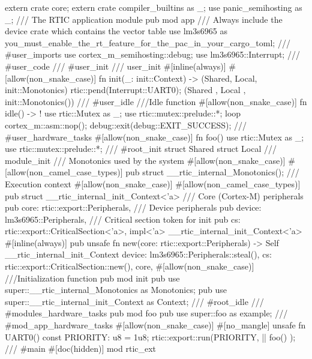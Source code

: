 extern crate core;
extern crate compiler_builtins as _;
use panic_semihosting as _;
/// The RTIC application module
pub mod app {
    /// Always include the device crate which contains the vector table
    use lm3s6965 as you_must_enable_the_rt_feature_for_the_pac_in_your_cargo_toml;
    /// #user_imports
    use cortex_m_semihosting::debug;
    use lm3s6965::Interrupt;
    /// #user_code
    /// #user_init
    /// user_init
    #[inline(always)]
    #[allow(non_snake_case)]
    fn init(_: init::Context) -> (Shared, Local, init::Monotonics) {
        rtic::pend(Interrupt::UART0);
        (Shared {}, Local {}, init::Monotonics())
    }
    /// #user_idle
    ///Idle function
    #[allow(non_snake_case)]
    fn idle() -> ! {
        use rtic::Mutex as _;
        use rtic::mutex::prelude::*;
        loop {
            cortex_m::asm::nop();
            debug::exit(debug::EXIT_SUCCESS);
        }
    }
    /// #user_hardware_tasks
    #[allow(non_snake_case)]
    fn foo() {
        use rtic::Mutex as _;
        use rtic::mutex::prelude::*;
    }
    /// #root_init
    struct Shared {}
    struct Local {}
    /// module_init
    /// Monotonics used by the system
    #[allow(non_snake_case)]
    #[allow(non_camel_case_types)]
    pub struct __rtic_internal_Monotonics();
    /// Execution context
    #[allow(non_snake_case)]
    #[allow(non_camel_case_types)]
    pub struct __rtic_internal_init_Context<'a> {
        /// Core (Cortex-M) peripherals
        pub core: rtic::export::Peripherals,
        /// Device peripherals
        pub device: lm3s6965::Peripherals,
        /// Critical section token for init
        pub cs: rtic::export::CriticalSection<'a>,
    }
    impl<'a> __rtic_internal_init_Context<'a> {
        #[inline(always)]
        pub unsafe fn new(core: rtic::export::Peripherals) -> Self {
            __rtic_internal_init_Context {
                device: lm3s6965::Peripherals::steal(),
                cs: rtic::export::CriticalSection::new(),
                core,
            }
        }
    }
    #[allow(non_snake_case)]
    ///Initialization function
    pub mod init {
        pub use super::__rtic_internal_Monotonics as Monotonics;
        pub use super::__rtic_internal_init_Context as Context;
    }
    /// #root_idle
    /// #modules_hardware_tasks
    pub mod foo {
        pub use super::foo as example;
    }
    /// #mod_app_hardware_tasks
    #[allow(non_snake_case)]
    #[no_mangle]
    unsafe fn UART0() {
        const PRIORITY: u8 = 1u8;
        rtic::export::run(PRIORITY, || { foo() });
    }
    /// #main
    #[doc(hidden)]
    mod rtic_ext {
}}
